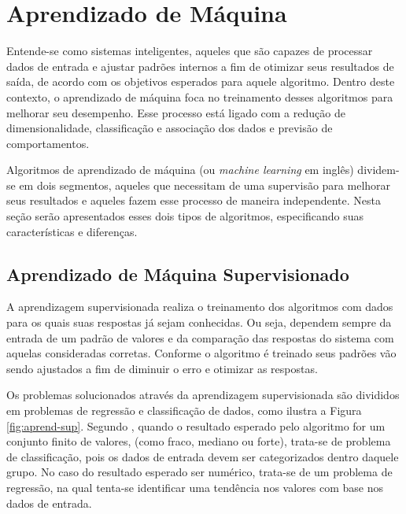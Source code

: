 \documentclass[oneside,openright,12pt]{ufsm_2015} %
\begin{document}

\section{Aprendizado de Máquina}
\label{sec:aprend-maquina}

    \par Entende-se como sistemas inteligentes, aqueles que são capazes de processar dados de entrada e ajustar padrões internos a fim de otimizar seus resultados de saída, de acordo com os objetivos esperados para aquele algoritmo. Dentro deste contexto, o aprendizado de máquina foca no treinamento desses algoritmos para melhorar seu desempenho. Esse processo está ligado com a redução de dimensionalidade, classificação e associação dos dados e previsão de comportamentos.

    \par Algoritmos de aprendizado de máquina (ou \textit{machine learning} em inglês) dividem-se em dois segmentos, aqueles que necessitam de uma supervisão para melhorar seus resultados e aqueles fazem esse processo de maneira independente. Nesta seção serão apresentados esses dois tipos de algoritmos, especificando suas características e diferenças.


\subsection{Aprendizado de Máquina Supervisionado}
\label{sec:aprend-maquina-sup}

    \par A aprendizagem supervisionada realiza o treinamento dos algoritmos com dados para os quais suas respostas já sejam conhecidas. Ou seja, dependem sempre da entrada de um padrão de valores e da comparação das respostas do sistema com aquelas consideradas corretas. Conforme o algoritmo é treinado seus padrões vão sendo ajustados a fim de diminuir o erro e otimizar as respostas. 

    \par Os problemas solucionados através da aprendizagem supervisionada são divididos em problemas de regressão e classificação de dados, como ilustra a Figura \ref{fig:aprend-sup}. Segundo \cite{book:russell:10}, quando o resultado esperado pelo algoritmo for um conjunto finito de valores, (como fraco, mediano ou forte), trata-se de problema de classificação, pois os dados de entrada devem ser categorizados dentro daquele grupo. No caso do resultado esperado ser numérico, trata-se de um problema de regressão, na qual tenta-se identificar uma tendência nos valores com base nos dados de entrada.
\end{document}
